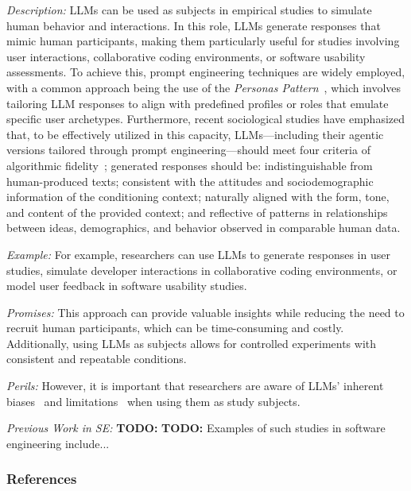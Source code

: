 \documentclass[11pt]{article}
\begin{document}
\emph{Description:} LLMs can be used as subjects in empirical studies to simulate human behavior and interactions. In this role, LLMs generate responses that mimic human participants, making them particularly useful for studies involving user interactions, collaborative coding environments, or software usability assessments. 
To achieve this, prompt engineering techniques are widely employed, with a common approach being the use of the \textit{Personas Pattern}~\cite{DBLP:journals/corr/abs-2308-07702}, which involves tailoring LLM responses to align with predefined profiles or roles that emulate specific user archetypes. 
Furthermore, recent sociological studies have emphasized that, to be effectively utilized in this capacity, LLMs—including their agentic versions tailored through prompt engineering—should meet four criteria of algorithmic fidelity~\cite{DBLP:journals/corr/abs-2209-06899}; generated responses should be: indistinguishable from human-produced texts; consistent with the attitudes and sociodemographic information of the conditioning context; naturally aligned with the form, tone, and content of the provided context; and reflective of patterns in relationships between ideas, demographics, and behavior observed in comparable human data.

\emph{Example:} For example, researchers can use LLMs to generate responses in user studies, simulate developer interactions in collaborative coding environments, or model user feedback in software usability studies.

\emph{Promises:}  This approach can provide valuable insights while reducing the need to recruit human participants, which can be time-consuming and costly. Additionally, using LLMs as subjects allows for controlled experiments with consistent and repeatable conditions.

\emph{Perils:} However, it is important that researchers are aware of LLMs' inherent biases~\cite{Crowell2023} and limitations~\cite{DBLP:journals/ais/HardingDLL24} when using them as study subjects.

\emph{Previous Work in SE:}  \textbf{TODO:}  \textbf{TODO:} Examples of such studies in software engineering include...

\subsubsection{References}



\end{document}
